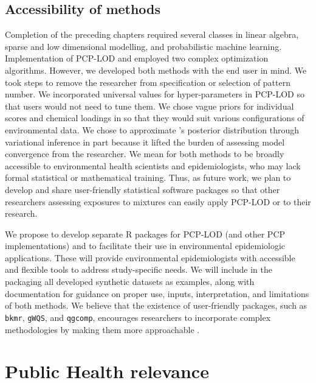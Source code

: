 \subsection{Accessibility of methods}
Completion of the preceding chapters required several classes in linear algebra, sparse and low dimensional modelling, and probabilistic machine learning. Implementation of PCP-LOD and \bnmf employed two complex optimization algorithms. However, we developed both methods with the end user in mind. We took steps to remove the researcher from specification or selection of pattern number. We incorporated universal values for hyper-parameters in PCP-LOD so that users would not need to tune them. We chose vague priors for individual scores and chemical loadings in \bnmf so that they would suit various configurations of environmental data. We chose to approximate \bnmfc's posterior distribution through variational inference in part because it lifted the burden of assessing model convergence from the researcher. We mean for both methods to be broadly accessible to environmental health scientists and epidemiologists, who may lack formal statistical or mathematical training. Thus, as future work, we plan to develop and share user-friendly statistical software packages so that other researchers assessing exposures to mixtures can easily apply PCP-LOD or \bnmf to their research.

We propose to develop separate R packages for PCP-LOD (and other PCP implementations) and \bnmf to facilitate their use in environmental epidemiologic applications. These will provide environmental epidemiologists with accessible and flexible tools to address study-specific needs. We will include in the packaging all developed synthetic datasets as examples, along with documentation for guidance on proper use, inputs, interpretation, and limitations of both methods. We believe that the existence of user-friendly packages, such as \texttt{bkmr}, \texttt{gWQS}, and \texttt{qgcomp}, encourages researchers to incorporate complex methodologies by making them more approachable \citep{bobb2018statistical, renzetti2016gwqs, keil2020quantile}.

\section{Public Health relevance}\label{sec:ph}

